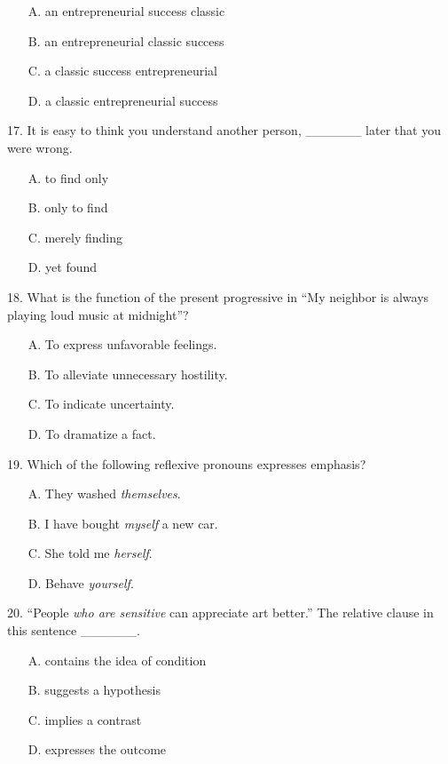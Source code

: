\documentclass[UTF8,11pt]{ctexart}
\begin{document}
\begin{itemize}[leftmargin=2em,itemsep=.2em,topsep=.4em]\item[A.] an entrepreneurial success classic
\item[B.] an entrepreneurial classic success
\item[C.] a classic success entrepreneurial
\item[D.] a classic entrepreneurial success
\end{itemize}

17. It is easy to think you understand another person, \_\_\_\_\_\_ later that you were wrong.


\begin{itemize}[leftmargin=2em,itemsep=.2em,topsep=.4em]\item[A.] to find only
\item[B.] only to find
\item[C.] merely finding
\item[D.] yet found
\end{itemize}

18. What is the function of the present progressive in “My neighbor is always playing loud music at midnight”?


\begin{itemize}[leftmargin=2em,itemsep=.2em,topsep=.4em]\item[A.] To express unfavorable feelings.
\item[B.] To alleviate unnecessary hostility.
\item[C.] To indicate uncertainty.
\item[D.] To dramatize a fact.
\end{itemize}

19. Which of the following reflexive pronouns expresses emphasis?


\begin{itemize}[leftmargin=2em,itemsep=.2em,topsep=.4em]\item[A.] They washed \textit{themselves}.
\item[B.] I have bought \textit{myself} a new car.
\item[C.] She told me \textit{herself}.
\item[D.] Behave \textit{yourself}.
\end{itemize}

20. “People \textit{who are sensitive} can appreciate art better.” The relative clause in this sentence \_\_\_\_\_\_.


\begin{itemize}[leftmargin=2em,itemsep=.2em,topsep=.4em]\item[A.] contains the idea of condition
\item[B.] suggests a hypothesis
\item[C.] implies a contrast
\item[D.] expresses the outcome
\end{itemize}
\end{document}

